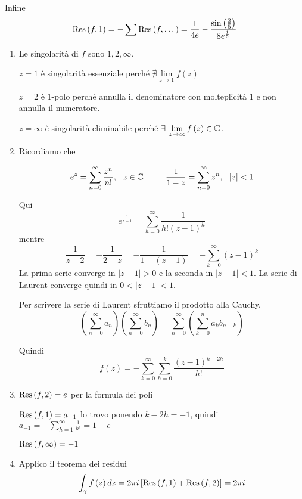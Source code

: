 Infine
\begin{equation*}
\operatorname{Res} \left( f,1\right) =-\sum \operatorname{Res} \left( f,\dotsc \right) =\frac{1}{4e} -\frac{\sin\left(\frac{2}{5}\right)}{8e^{\frac{1}{5}}}
\end{equation*}
\Soluzione
\begin{enumerate}
\item Le singolarità di $f$ sono $1,2,\infty $.

$z=1$ è singolarità essenziale perché $\nexists \lim\limits _{z\rightarrow 1} f\left( z\right)$

$z=2$ è $1$-polo perché annulla il denominatore con molteplicità $1$ e non annulla il numeratore.

$z=\infty $ è singolarità eliminabile perché $\exists \lim\limits _{z\rightarrow \infty } f\left( z\right) \in \CC $.
\item Ricordiamo che

\begin{rem}
\begin{equation*}
e^{z} =\sum\limits ^{\infty }_{n=0}\frac{z^{n}}{n!} ,\ \ z\in \mathbb{C}  \ \ \ \ \ \ \ \ \frac{1}{1-z} =\sum\limits ^{\infty }_{n=0} z^{n} ,\ \ \left| z\right| < 1
\end{equation*}
\end{rem}

Qui\begin{equation*}
e^{\frac{1}{z-1}} =\sum\limits ^{\infty }_{h=0}\frac{1}{h!\left( z-1\right)^{h}}
\end{equation*}mentre\begin{equation*}
\frac{1}{z-2} =-\frac{1}{2-z} =-\frac{1}{1-\left( z-1\right)} =-\sum\limits ^{\infty }_{k=0}\left( z-1\right)^{k}
\end{equation*}La prima serie converge in $\left| z-1\right|  >0$ e la seconda in $\left| z-1\right| < 1$. La serie di Laurent converge quindi in $0< \left| z-1\right| < 1$.\begin{rem}
Per scrivere la serie di Laurent sfruttiamo il prodotto alla Cauchy.
\begin{equation*}
\left(\sum\limits ^{\infty }_{n=0} a_{n}\right)\left(\sum\limits ^{\infty }_{n=0} b_{n}\right) =\sum\limits ^{\infty }_{n=0}\left(\sum\limits ^{n}_{k=0} a_{k} b_{n-k}\right)
\end{equation*}
\end{rem}Quindi\begin{equation*}
f\left( z\right) =-\sum\limits ^{\infty }_{k=0}\sum\limits ^{k}_{h=0}\frac{\left( z-1\right)^{k-2h}}{h!}
\end{equation*}
\item $\operatorname{Res} \left( f,2\right) =e$ per la formula dei poli

$\operatorname{Res} \left( f,1\right) =a_{-1}$ lo trovo ponendo $k-2h=-1$, quindi $a_{-1} =-\sum\limits ^{\infty }_{h=1}\frac{1}{h!} =1-e$

$\operatorname{Res} \left( f,\infty \right) =-1$
\item Applico il teorema dei residui\begin{equation*}
\int\nolimits _{\gamma } f\left( z\right) dz=2\pi i\left[\operatorname{Res} \left( f,1\right) +\operatorname{Res} \left( f,2\right)\right] =2\pi i
\end{equation*}
\end{enumerate}
